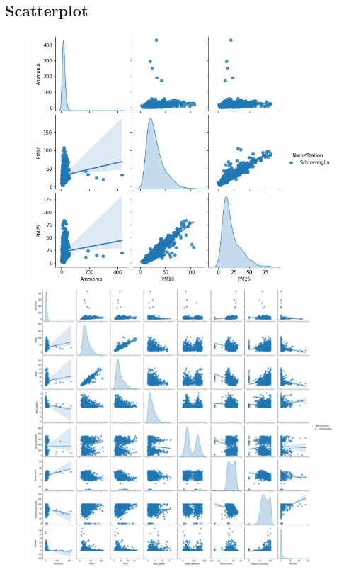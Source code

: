 \documentclass{article}
\begin{document}
\subsection{Scatterplot}
\begin{figure}[H]
  \centering
  \includegraphics[scale = 0.55]{Picture/Scatter/SchivenogliaScatter.png}
  \includegraphics[scale = 0.3]{Picture/Scatter/SchivenogliaScatterBig.png}
  \centering 
\end{figure}
\end{document}
